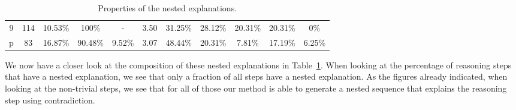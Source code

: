 \begin{table}[t]
\begin{tabular}{c|c|ccc|c|ccccc}
		9 &      114 &  10.53\% &  100\% &  - &         3.50 &  31.25\% &   28.12\% &  20.31\% &    20.31\% &    0\% \\
		p &       83 &  16.87\% &   90.48\% &  9.52\% &         3.07 &  48.44\% &   20.31\% &   7.81\% &    17.19\% &    6.25\% \\
	\end{tabular}
	\caption{Properties of the nested explanations.   }
	\label{table:nested_explanation}
\end{table}

We now have a closer look at the composition of these nested explanations in Table~\ref{table:nested_explanation}.
When looking at the percentage of reasoning steps that have a nested explanation, we see that only a fraction of all steps have a nested explanation. 
As the figures already indicated, when looking at the non-trivial steps, we see that for all of those our method is able to generate a nested sequence that explains the reasoning step using contradiction. 



